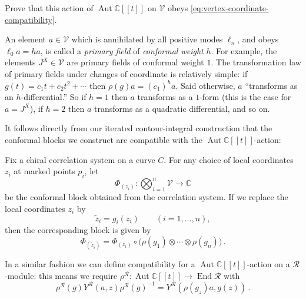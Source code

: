 \documentclass[12pt,letterpaper,reqno]{amsart}
\numberwithin{equation}{section}
\newcommand{\Autdisc}{\ensuremath{\Aut \bbC[[t]]}}
\newcommand{\bbC}{\ensuremath{\mathbb C}}
\newcommand{\bbZ}{\ensuremath{\mathbb Z}}
\newcommand{\vertex}{\mathcal{V}}
\newcommand{\vrep}{\mathcal{R}}
\newcommand{\ti}[1]{\textit{#1}}
\DeclareMathOperator{\End}{End}
\DeclareMathOperator{\Aut}{Aut}
\DeclareRobustCommand{\fixme}[1]{\leavevmode{\color{orange}[#1]}}
\begin{document}
\begin{exercise}
Prove that this action of $\Autdisc$ on $\vertex$ 
obeys \eqref{eq:vertex-coordinate-compatibility}.
\fixme{check, give an appropriate hint!}
\end{exercise}

An element $a \in \vertex$ 
which is annihilated by all positive modes $\ell_n$, and obeys $\ell_0 a = h a$,
is called a \ti{primary field} of \ti{conformal weight} $h$. 
For example, the elements $J^X \in \vertex$ are primary fields of conformal weight $1$.
The transformation law of primary fields 
under changes of coordinate is relatively simple: if $g(t) = c_1 t + c_2 t^2 + \cdots$ then
$\rho(g) a = (c_1)^h a$.
Said otherwise, $a$ ``transforms as an $h$-differential.''
So if $h=1$ then $a$ transforms as a $1$-form (this is the case
for $a = J^X$), if $h=2$ then $a$ transforms as a quadratic differential, and so on.

It follows directly from our iterated contour-integral construction that 
the conformal blocks we construct are compatible with the $\Autdisc$-action:
\begin{prop}
Fix a chiral correlation system on a curve $C$.
For any choice of local coordinates $z_i$ at marked points $p_i$, let
\[
\Phi_{(z_i)} : \bigotimes_{i=1}^n \vertex \to \bbC
\]
be the conformal block obtained from the correlation system.
If we replace the local coordinates $z_i$ by
\[
\tilde z_i = g_i(z_i)\qquad (i=1,\dots,n),
\]
then the corresponding block is given by
\[
\Phi_{(\tilde z_i)}
= \Phi_{(z_i)} \circ \bigl(\rho(g_1)\otimes\cdots\otimes \rho(g_n)\bigr) \, .
\]
\end{prop}

In a similar fashion we can define compatibility for a $\Autdisc$-action on a $\vrep$-module:
this means we require
$\rho^\vrep: \Autdisc \to \End \vrep$ with
\begin{equation}
  \rho^\vrep(g) Y^\vrep(a,z) \rho^\vrep(g)^{-1} = Y^\vrep(\rho(g_z) a, g(z)) \, .
\end{equation}
\end{document}

